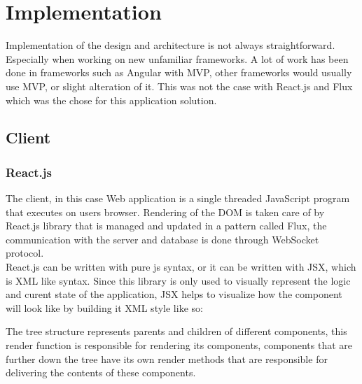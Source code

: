 \chapter{Implementation}
Implementation of the design and architecture is not always straightforward. Especially when working on new unfamiliar frameworks. A lot of work has been done in frameworks such as Angular with MVP, other frameworks would usually use MVP, or slight alteration of it. This was not the case with React.js and Flux which was the chose for this application solution.

\section{Client}
\subsection{React.js}
The client, in this case Web application is a single threaded JavaScript program that executes on users browser. Rendering of the DOM is taken care of by React.js library that is managed and updated in a pattern called Flux, the communication with the server and database is done through WebSocket protocol.
\\React.js can be written with pure js syntax, or it can be written with JSX, which is XML like syntax. Since this library is only used to visually represent the logic and curent state of the application, JSX helps to visualize how the component will look like by building it XML style like so:

\newpage


The tree structure represents parents and children of different components, this render function is responsible for rendering its components, components that are further down the tree have its own render methods that are responsible for delivering the contents of these components.

